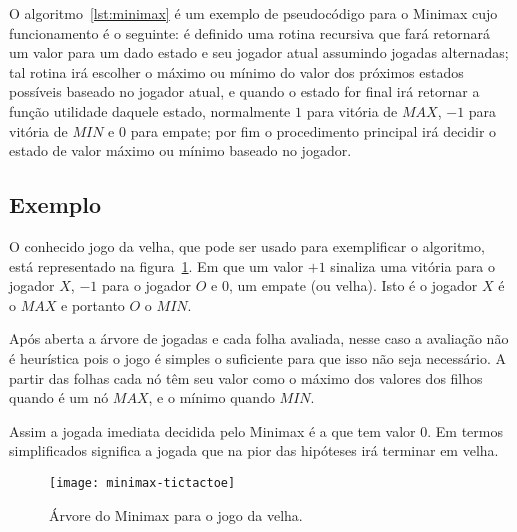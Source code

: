 O algoritmo~\ref{lst:minimax} é um exemplo de pseudocódigo para o Minimax cujo
funcionamento é o seguinte: é definido uma rotina recursiva que fará retornará
um valor para um dado estado e seu jogador atual assumindo jogadas alternadas;
tal rotina irá escolher o máximo ou mínimo do valor dos próximos estados
possíveis baseado no jogador atual, e quando o estado for final irá retornar a
função utilidade daquele estado, normalmente $1$ para vitória de $MAX$, $-1$
para vitória de $MIN$ e $0$ para empate; por fim o procedimento principal irá
decidir o estado de valor máximo ou mínimo baseado no jogador.

\nocite{lavalle2006planning}
\nocite{russell2003artificial}


\subsection{Exemplo}

%

O conhecido jogo da velha, que pode ser usado para exemplificar o algoritmo,
está representado na figura~\ref{fig:minimax-tictactoe}. Em que um valor $+1$
sinaliza uma vitória para o jogador $X$, $-1$ para o jogador $O$ e $0$, um
empate (ou velha).  Isto é o jogador $X$ é o $MAX$ e portanto $O$ o $MIN$.

Após aberta a árvore de jogadas e cada folha avaliada, nesse caso a avaliação
não é heurística pois o jogo é simples o suficiente para que isso não seja
necessário. A partir das folhas cada nó têm seu valor como o máximo dos valores
dos filhos quando é um nó $MAX$, e o mínimo quando $MIN$.

Assim a jogada imediata decidida pelo Minimax é a que tem valor $0$. Em termos
simplificados significa a jogada que na pior das hipóteses irá terminar em
velha.

\begin{figure}
  \centering
  \texttt{[image: minimax-tictactoe]}
  \caption{Árvore do Minimax para o jogo da velha.}\label{fig:minimax-tictactoe}
\end{figure}

